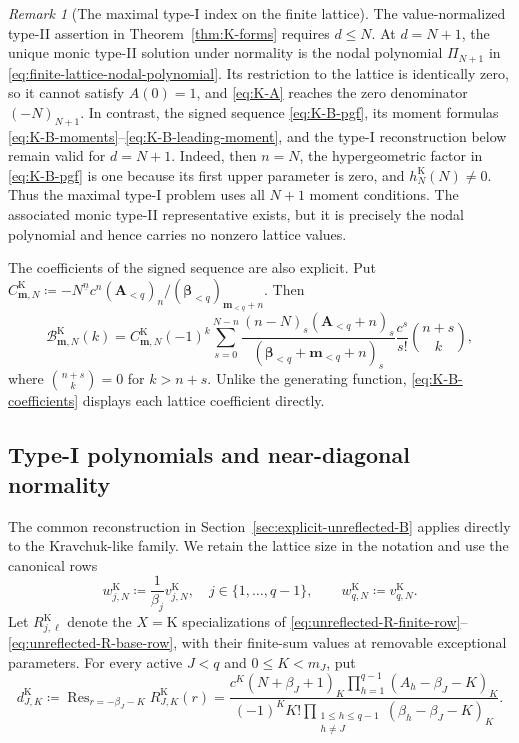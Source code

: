 \documentclass[10pt]{amsart}
\newcommand{\A}{\boldsymbol A}
\newcommand{\bbeta}{\boldsymbol\beta}
\newcommand{\mm}{\boldsymbol m}
\newcommand{\fall}[2]{#1^{\underline{#2}}}
\DeclareMathOperator*{\Res}{Res}
\theoremstyle{plain}
\theoremstyle{definition}
\theoremstyle{remark}
\newtheorem{remark}[theorem]{Remark}
\begin{document}
\begin{remark}[The maximal type-I index on the finite lattice]
\label{rem:K-maximal-type-I-index}
The value-normalized type-II assertion in Theorem~\ref{thm:K-forms}
requires \(d\le N\). At \(d=N+1\), the unique monic type-II solution
under normality is the nodal polynomial \(\Pi_{N+1}\) in
\eqref{eq:finite-lattice-nodal-polynomial}. Its restriction to the
lattice is identically zero, so it cannot satisfy \(A(0)=1\), and
\eqref{eq:K-A} reaches the zero denominator \((-N)_{N+1}\). In contrast,
the signed sequence \eqref{eq:K-B-pgf}, its moment formulas
\eqref{eq:K-B-moments}--\eqref{eq:K-B-leading-moment}, and the type-I
reconstruction below remain valid for \(d=N+1\).  Indeed, then \(n=N\),
the hypergeometric factor in \eqref{eq:K-B-pgf} is one because its first
upper parameter is zero, and \(h_N^{\mathrm K}(N)\ne0\).  Thus the
maximal type-I problem uses all \(N+1\) moment conditions. The associated
monic type-II representative exists, but it is precisely the nodal
polynomial and hence carries no nonzero lattice values.
\end{remark}

The coefficients of the signed sequence are also explicit. Put
\(C_{\mm,N}^{\mathrm K}
\coloneq-\fall{N}{n}c^n(\A_{<q})_n/
(\bbeta_{<q})_{\mm_{<q}+n}\). Then
\begin{equation}
 \mathcal B_{\mm,N}^{\mathrm K}(k)
 =
 C_{\mm,N}^{\mathrm K}(-1)^k
 \sum_{s=0}^{N-n}
 \frac{(n-N)_s(\A_{<q}+n)_s}
 {(\bbeta_{<q}+\mm_{<q}+n)_s}
 \frac{c^s}{s!}\binom{n+s}{k},
 \label{eq:K-B-coefficients}
\end{equation}
where \(\binom{n+s}{k}=0\) for \(k>n+s\). Unlike the generating
function, \eqref{eq:K-B-coefficients} displays each lattice coefficient
directly.

\subsection{Type-I polynomials and near-diagonal normality}

The common reconstruction in Section~\ref{sec:explicit-unreflected-B}
applies directly to the Kravchuk-like family. We retain the lattice size
in the notation and use the canonical rows
\begin{equation}
 w_{j,N}^{\mathrm K}\coloneq
 \frac{1}{\beta_j}v_{j,N}^{\mathrm K},
 \quad j\in\{1,\ldots,q-1\},
 \qquad
 w_{q,N}^{\mathrm K}\coloneq v_{q,N}^{\mathrm K}.
 \label{eq:K-canonical-rows}
\end{equation}
Let \(R_{j,\ell}^{\mathrm K}\) denote the \(X=\mathrm K\) specializations
of \eqref{eq:unreflected-R-finite-row}--
\eqref{eq:unreflected-R-base-row}, with their finite-sum values at removable
exceptional parameters. For every active \(J<q\) and \(0\le K<m_J\), put
\begin{equation}
 d_{J,K}^{\mathrm K}\coloneq
 \Res_{r=-\beta_J-K}R_{J,K}^{\mathrm K}(r)
 =\frac{c^K(N+\beta_J+1)_K
 \prod_{h=1}^{q-1}(A_h-\beta_J-K)_K}
 {(-1)^K K!\prod_{\substack{1\le h\le q-1\\h\ne J}}
 (\beta_h-\beta_J-K)_K}.
 \label{eq:K-diagonal-residue}
\end{equation}
\end{document}
